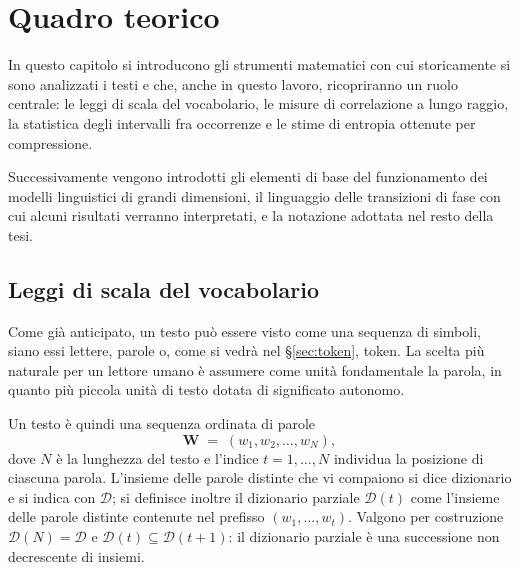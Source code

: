 
\chapter{Quadro teorico}
\label{cap:teoria}

In questo capitolo si introducono gli strumenti matematici con cui storicamente
si sono analizzati i testi e che, anche in questo lavoro, ricopriranno un ruolo
centrale: le leggi di scala del vocabolario, le misure di correlazione a lungo
raggio, la statistica degli intervalli fra occorrenze e le stime di entropia
ottenute per compressione.

Successivamente vengono introdotti gli elementi di base del funzionamento dei
modelli linguistici di grandi dimensioni, il linguaggio delle transizioni di
fase con cui alcuni risultati verranno interpretati, e la notazione adottata nel
resto della tesi.


\section{Leggi di scala del vocabolario}
\label{sec:scala}

Come già anticipato, un testo può essere visto come una sequenza di simboli,
siano essi lettere, parole o, come si vedrà nel §\ref{sec:token}, token. La
scelta più naturale per un lettore umano è assumere come unità fondamentale la
parola, in quanto più piccola unità di testo dotata di significato autonomo.

Un testo è quindi una sequenza ordinata di parole
\begin{equation}
  \mathbf{W} \;=\; (w_1, w_2, \dots, w_N),
  \label{eq:sequenza}
\end{equation}
dove $N$ è la lunghezza del testo e l'indice $t = 1,\dots,N$ individua la
posizione di ciascuna parola. L'insieme delle parole distinte che vi compaiono
si dice dizionario e si indica con $\mathcal{D}$; si definisce inoltre il
dizionario parziale $\mathcal{D}(t)$ come l'insieme delle parole distinte
contenute nel prefisso $(w_1,\dots,w_t)$. Valgono per costruzione
$\mathcal{D}(N) = \mathcal{D}$ e $\mathcal{D}(t) \subseteq \mathcal{D}(t+1)$: il
dizionario parziale è una successione non decrescente di insiemi.

